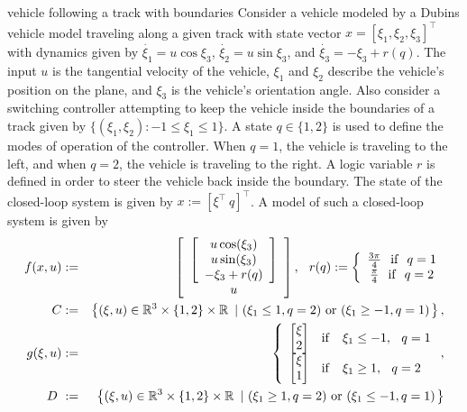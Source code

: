 \begin{example}{vehicle following a track with boundaries}
\label{ex:dubinspath}
Consider a vehicle modeled by a Dubins vehicle model traveling along a given track with state vector $x=[\xi_1, \xi_2, \xi_3]^\top$ with dynamics given by $\dot{\xi_1}=u\cos{\xi_3}$, $\dot{\xi_2}=u\sin{\xi_3}$, and $\dot{\xi_3}=-\xi_3+r(q)$. The input $u$ is the tangential velocity of the vehicle, $\xi_1$ and $\xi_2$ describe the vehicle's position on the plane, and $\xi_3$ is the vehicle's orientation angle. Also consider a switching controller attempting to keep the vehicle inside the boundaries of a track given by $\{(\xi_1,\xi_2):-1\leq\xi_1\leq1\}$. A state $q \in \{1,2\}$ is used to define the modes of operation of the controller. When $q=1$, the vehicle is traveling to the left, and when $q=2$, the vehicle is traveling to the right. A logic variable $r$ is defined in order to steer the vehicle back inside the boundary. The state of the closed-loop system is given by $x := [\xi^\top\ q]^\top$. A model of such a closed-loop system is given by
\begin{eqnarray}
f(x,u) & := & \left[
\begin{array}{c}
 \left[
\begin{array}{c}
   u\cos(\xi_3) \\
   u\sin(\xi_3)\\
   -\xi_3+r(q)\\
\end{array} \right] \\
u
\end{array} \right], \hspace{.1in}
r(q) := \left\{
\begin{array}{c}
\frac{3\pi}{4} \hspace{.1in} $if$ \hspace{.1in} q=1\\
\frac{\pi}{4} \hspace{.1in} $if$ \hspace{.1in} q=2 \\
\end{array} \right. \\
C & : = & \defset{(\xi,u)\in \Re^{3}\times\{1,2\}\times \Re}{(\xi_1 \leq 1 , q = 2) \mbox { or } (\xi_1 \geq -1 , q=1)}, \\
g(\xi,u) &:=&
\left\{
\begin{array}{ll}
\matt{\xi \\ 2 }
& $if$ \hspace{.15in} \xi_1\leq-1, \hspace{.1in} q=1\\
\matt{\xi \\ 1 }
& $if$ \hspace{.15in} \xi_1\geq 1, \hspace{.1in} q=2
\end{array} \right. ,\\
    D\ &: =&\defset{(\xi,u)\in \Re^{3}\times\{1,2\} \times \Re}{(\xi_1 \geq 1 ,  q = 2) \mbox { or } (\xi_1 \leq -1 ,  q=1)}
\end{eqnarray}


\end{example}
